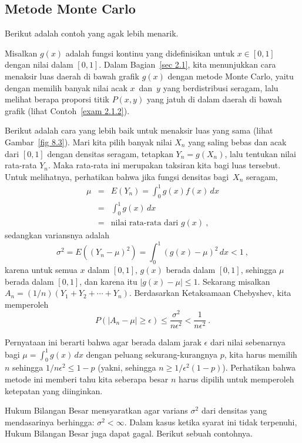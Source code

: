 {\subsection*{Metode Monte Carlo}
Berikut adalah contoh yang agak lebih menarik.

\begin{example}
Misalkan $g(x)$ adalah fungsi kontinu yang didefinisikan untuk $x \in [0,1]$ dengan nilai dalam
$[0,1]$.  Dalam Bagian~\ref{sec 2.1}, kita menunjukkan cara menaksir luas
daerah di bawah grafik $g(x)$ dengan metode Monte Carlo, yaitu dengan
memilih banyak nilai acak $x$~dan~$y$ yang berdistribusi
seragam, lalu melihat berapa proporsi titik $P(x,y)$ yang jatuh di dalam
daerah di bawah grafik (lihat Contoh~\ref{exam 2.1.2}).
\par
Berikut adalah cara yang lebih baik untuk menaksir luas yang sama (lihat Gambar~\ref{fig 8.3}).  Mari kita pilih
banyak nilai $X_n$ yang saling bebas dan acak dari $[0,1]$ dengan
densitas seragam, tetapkan $Y_n = g(X_n)$, lalu tentukan nilai rata-rata $Y_n$.  Maka
rata-rata ini merupakan taksiran kita bagi luas tersebut.  Untuk melihatnya, perhatikan bahwa jika
fungsi densitas bagi~$X_n$ seragam,
\begin{eqnarray*}
\mu & = & E(Y_n) = \int_0^1 g(x) f(x)\, dx \\
    & = & \int_0^1 g(x)\, dx \\
    & = & \mbox {nilai\ rata-rata\ dari\ }  g(x)\ ,
\end{eqnarray*}
sedangkan variansnya adalah
$$
\sigma^2 = E((Y_n - \mu)^2) = \int_0^1 (g(x) - \mu)^2\, dx < 1\ ,
$$
karena untuk semua $x$ dalam $[0, 1]$, $g(x)$ berada dalam $[0, 1]$, sehingga $\mu$ berada dalam $[0, 1]$, dan
karena itu $|g(x) - \mu| \le 1$.  Sekarang misalkan $A_n = (1/n)(Y_1 + Y_2 +\cdots+ Y_n)$.  Berdasarkan Ketaksamaan
Chebyshev, kita memperoleh
$$
P(|A_n - \mu| \geq \epsilon) \leq \frac {\sigma^2}{n\epsilon^2} < \frac
1{n\epsilon^2}\ .
$$


Pernyataan ini berarti bahwa agar berada dalam jarak $\epsilon$ dari nilai sebenarnya bagi $\mu = \int_0^1
g(x)\, dx$ dengan peluang sekurang-kurangnya $p$, kita harus memilih $n$ sehingga
$1/n\epsilon^2 \leq 1 - p$ (yakni, sehingga $n \geq 1/\epsilon^2(1 - p)$).  Perhatikan
bahwa metode ini memberi tahu kita seberapa besar $n$ harus dipilih untuk memperoleh ketepatan yang diinginkan.
\end{example}

Hukum Bilangan Besar mensyaratkan agar varians $\sigma^2$ dari densitas
yang mendasarinya berhingga: $\sigma^2 < \infty$.  Dalam kasus ketika syarat ini tidak
terpenuhi, Hukum Bilangan Besar juga dapat gagal.  Berikut sebuah contohnya.

}
